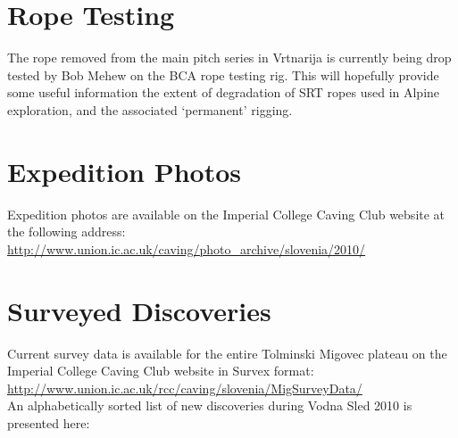 \documentclass[english,a4]{article}
\begin{document}
\section{Rope Testing}

The rope removed from the main pitch series in Vrtnarija is currently being
drop tested by Bob Mehew on the BCA rope testing rig. This will hopefully
provide some useful information the extent of degradation of SRT ropes used in
Alpine exploration, and the associated `permanent' rigging.

\section{Expedition Photos}

Expedition photos are available on the Imperial College Caving Club website at the following address:\\

\url{http://www.union.ic.ac.uk/caving/photo\_archive/slovenia/2010/}

\section{Surveyed Discoveries}

Current survey data is available for the entire Tolminski Migovec plateau on the Imperial College Caving Club website in Survex format:\\

\url{http://www.union.ic.ac.uk/rcc/caving/slovenia/MigSurveyData/}
\\
An alphabetically sorted list of new discoveries during Vodna Sled 2010 is presented here:\\
\end{document}
